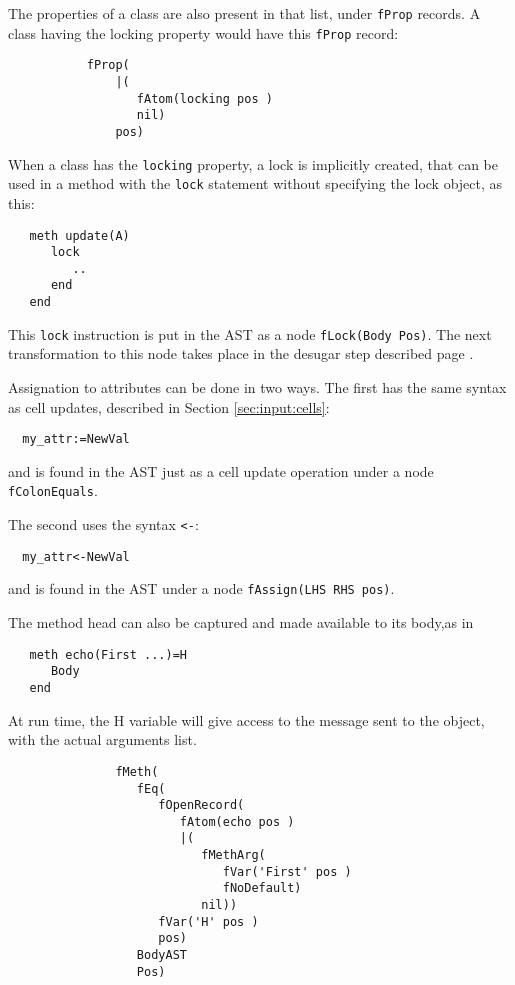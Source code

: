 \documentclass[a4paper]{memoir}
\begin{document}
The properties of a class are also present in that list, under \lstinline!fProp!
records. A class having the locking property would have this \lstinline!fProp! record:

\begin{lstlisting}
           fProp(
               |(
                  fAtom(locking pos )
                  nil)
               pos)
\end{lstlisting}

When a class has the \lstinline!locking! property, a lock is implicitly created,
that can be used in a method with the \lstinline!lock! statement without
specifying the lock object, as this:

\begin{lstlisting}
   meth update(A)
      lock
         ..
      end
   end
\end{lstlisting}

This \lstinline!lock! instruction is put in the AST as a node
\lstinline!fLock(Body Pos)!. The next transformation to this node 
takes place in the desugar step described page \pageref{desugar:classes:lock}.

Assignation to attributes can be done in two ways. The first has the same syntax
as cell updates, described in Section \ref{sec:input:cells}:
\begin{lstlisting}
  my_attr:=NewVal
\end{lstlisting}
and is found in the AST just as a cell update operation under a node
\lstinline!fColonEquals!.

The second uses the syntax \lstinline!<-!:
\begin{lstlisting}
  my_attr<-NewVal
\end{lstlisting}
and is found in the AST under a node \lstinline!fAssign(LHS RHS pos)!.

\label{compilerinput:classes:headcapture}The method head can also be captured and made available to its body,as in 
\begin{lstlisting}
   meth echo(First ...)=H
      Body
   end  
\end{lstlisting}
At run time, the H variable will give access to the message sent to the object, with the actual arguments list.
\begin{lstlisting}
               fMeth(
                  fEq(
                     fOpenRecord(
                        fAtom(echo pos )
                        |(
                           fMethArg(
                              fVar('First' pos )
                              fNoDefault)
                           nil))
                     fVar('H' pos )
                     pos)
                  BodyAST
                  Pos)
\end{lstlisting}
\end{document}
